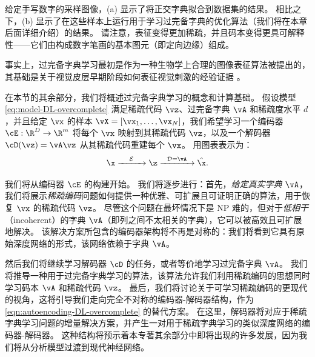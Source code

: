 \documentclass[../../book-main_zh.tex]{subfiles}
\begin{document}
\begin{example}
    给定手写数字的采样图像，(a) 显示了将正交字典拟合到数据集的结果。
    相比之下，(b) 显示了在这些样本上运行用于学习过完备字典的优化算法（我们将在本章后面详细介绍）的结果。
    请注意，表征变得更加稀疏，并且码本变得更具可解释性——它们由构成数字笔画的基本图元（即定向边缘）组成。
\end{example}

事实上，过完备字典学习最初是作为一种生物学上合理的图像表征算法被提出的，其基础是关于视觉皮层早期阶段如何表征视觉刺激的经验证据
\cite{Olshausen1996-ap,Olshausen1997-yv}。

在本节的其余部分，我们将概述过完备字典学习的概念和计算基础。
假设模型 \eqref{eq:model-DL-overcomplete} 满足稀疏代码 \(\vz\)、过完备字典 \(\vA\)
和稀疏度水平 \(d\)，并且给定 \(\vx\) 的样本 \(\vX = [\vx_1, \dots,
\vx_N]\)，我们希望学习一个编码器 \(\cE : \R^D \to \R^m\) 将每个 \(\vx\) 映射到其{稀疏代码}
\(\vz\)，以及一个解码器 \(\cD(\vz) = \vA \vz\) 从其稀疏代码重建每个 \(\vx\)。 %
用图表表示为：
\begin{equation}
    \x \xrightarrow{\hspace{4mm} \mathcal{E} \hspace{4mm}}  \z
    \xrightarrow{\hspace{2mm} \mathcal{D} = \vA \hspace{2mm}}   \hat{\x}.
    \label{eqn:autoencoding-DL-overcomplete}
\end{equation}

我们将从编码器 $\cE$ 的构建开始。
我们将逐步进行：首先，\textit{给定真实字典
$\vA$}，我们将展示\textit{稀疏编码}问题如何提供一种优雅、可扩展且可证明正确的算法，用于恢复 $\vx$ 的稀疏代码 $\vz$。
尽管这个问题在最坏情况下是 NP 难的，但对于\textit{低相干}（incoherent）的字典
$\vA$（即列之间不太相关的字典），它可以被高效且可扩展地解决。
该解决方案所包含的编码器架构将不再是对称的：我们将看到它具有原始深度网络的形式，该网络依赖于字典 $\vA$。

然后我们将继续学习解码器 $\cD$ 的任务，或者等价地学习过完备字典 $\vA$。
我们将推导一种用于过完备字典学习的算法，该算法允许我们利用稀疏编码的思想同时学习码本 $\vA$ 和稀疏代码 $\vz$。
最后，我们将讨论关于可学习稀疏编码的更现代的视角，这将引导我们走向完全不对称的编码器-解码器结构，作为
\eqref{eqn:autoencoding-DL-overcomplete} 的替代方案。
在这里，解码器将对应于稀疏字典学习问题的增量解决方案，并产生一对用于稀疏字典学习的类似深度网络的编码器-解码器。
这种结构将预示着本专著其余部分中即将出现的许多发展，因为我们将从分析模型过渡到现代神经网络。
\end{document}
